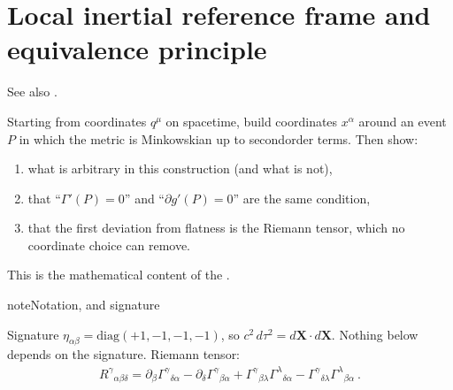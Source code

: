 \documentclass[letterpaper,10pt,english]{jupyterBook}
\begin{document}
\section{Local inertial reference frame and equivalence principle}
\label{\detokenize{ch/relativity-general/local-inertial-reference-frame-and-equivalence-principle:local-inertial-reference-frame-and-equivalence-principle}}\label{\detokenize{ch/relativity-general/local-inertial-reference-frame-and-equivalence-principle:general-relativity-local-inertial-reference-frame}}\label{\detokenize{ch/relativity-general/local-inertial-reference-frame-and-equivalence-principle::doc}}
\sphinxAtStartPar
See also .

\sphinxAtStartPar
{} Starting from  coordinates \(q^\mu\) on spacetime, build coordinates \(x^\alpha\) around an event \(P\) in which the metric is Minkowskian up to second\sphinxhyphen{}order terms. Then show:
\begin{enumerate}
%
\item {} 
\sphinxAtStartPar
what is arbitrary in this construction (and what is not),

\item {} 
\sphinxAtStartPar
that “\(\Gamma'(P)=0\)” and “\(\partial g'(P)=0\)” are the same condition,

\item {} 
\sphinxAtStartPar
that the first deviation from flatness is the Riemann tensor, which no coordinate choice can remove.

\end{enumerate}

\sphinxAtStartPar
This is the mathematical content of the .

\begin{sphinxadmonition}{note}{Notation, and signature}

\sphinxAtStartPar
{} Signature \(\eta_{\alpha\beta}=\mathrm{diag}(+1,-1,-1,-1)\), so \(c^2\,d\tau^2=d\mathbf X\cdot d\mathbf X\). Nothing below depends on the signature. Riemann tensor:
\begin{equation*}
\begin{split}R^\gamma{}_{\alpha\beta\delta}=\partial_\beta\Gamma^\gamma{}_{\delta\alpha}-\partial_\delta\Gamma^\gamma{}_{\beta\alpha}+\Gamma^\gamma{}_{\beta\lambda}\Gamma^\lambda{}_{\delta\alpha}-\Gamma^\gamma{}_{\delta\lambda}\Gamma^\lambda{}_{\beta\alpha}\ .\end{split}
\end{equation*}\end{sphinxadmonition}
\end{document}
